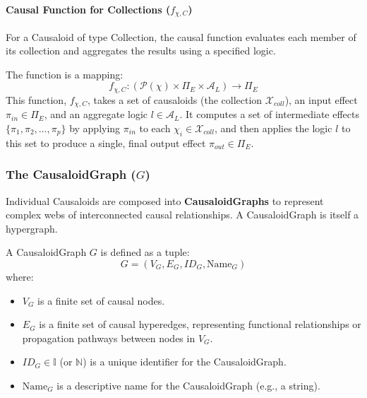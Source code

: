 \paragraph{Causal Function for Collections (\(f_{\chi,C}\))} For a Causaloid of type \(\text{Collection}\), the causal function evaluates each member of its collection and aggregates the results using a specified logic.

\begin{definition}
\label{def:causal_function_collection}
The function is a mapping:
\[ f_{\chi,C}: (\mathcal{P}(\chi) \times \Pi_E \times \mathcal{A}_L) \to \Pi_E \]
This function, \(f_{\chi,C}\), takes a set of causaloids (the collection \(\mathcal{X}_{coll}\)), an input effect \(\pi_{in} \in \Pi_E\), and an aggregate logic \(l \in \mathcal{A}_L\). It computes a set of intermediate effects \(\{\pi_1, \pi_2, \dots, \pi_p\}\) by applying \(\pi_{in}\) to each \(\chi_i \in \mathcal{X}_{coll}\), and then applies the logic \(l\) to this set to produce a single, final output effect \(\pi_{out} \in \Pi_E\).
\end{definition}

    
\subsubsection[The CausaloidGraph (\(G\))]{The CausaloidGraph (\(G\))}
\label{ssec:causaloidgraph_formal} 

    Individual Causaloids are composed into \textbf{CausaloidGraphs} to represent complex webs of interconnected causal relationships. A CausaloidGraph is itself a hypergraph.\newline
    
\begin{definition}[CausaloidGraph]
\label{def:causaloid_graph}
 A CausaloidGraph \( G \) is defined as a tuple:
        \[ G = (V_G, E_G, ID_G, \text{Name}_G) \]
        where:
        \begin{itemize}
            \item \( V_G \) is a finite set of causal nodes.
            \item \( E_G \) is a finite set of causal hyperedges, representing functional relationships or propagation pathways between nodes in \(V_G\).
            \item \( ID_G \in \mathbb{I} \) (or \(\mathbb{N}\)) is a unique identifier for the CausaloidGraph.
            \item \( \text{Name}_G \) is a descriptive name for the CausaloidGraph (e.g., a string).
        \end{itemize}
\end{definition}      
      

